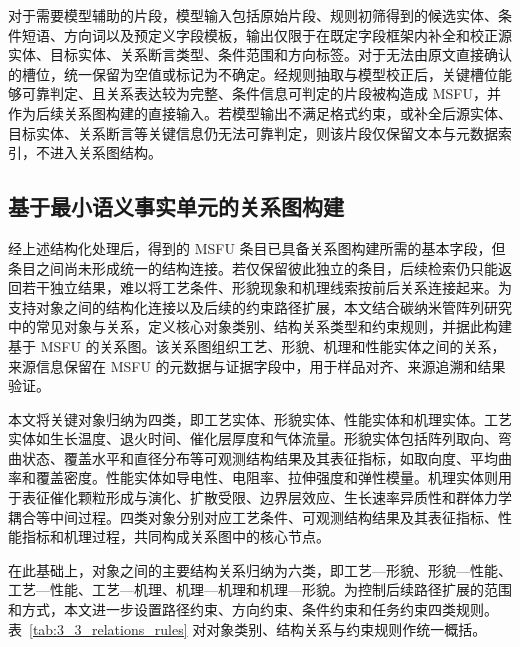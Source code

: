 对于需要模型辅助的片段，模型输入包括原始片段、规则初筛得到的候选实体、条件短语、方向词以及预定义字段模板，输出仅限于在既定字段框架内补全和校正源实体、目标实体、关系断言类型、条件范围和方向标签。对于无法由原文直接确认的槽位，统一保留为空值或标记为不确定。经规则抽取与模型校正后，关键槽位能够可靠判定、且关系表达较为完整、条件信息可判定的片段被构造成 MSFU，并作为后续关系图构建的直接输入。若模型输出不满足格式约束，或补全后源实体、目标实体、关系断言等关键信息仍无法可靠判定，则该片段仅保留文本与元数据索引，不进入关系图结构。

\subsection{基于最小语义事实单元的关系图构建}

经上述结构化处理后，得到的 MSFU 条目已具备关系图构建所需的基本字段，但条目之间尚未形成统一的结构连接。若仅保留彼此独立的条目，后续检索仍只能返回若干独立结果，难以将工艺条件、形貌现象和机理线索按前后关系连接起来。为支持对象之间的结构化连接以及后续的约束路径扩展，本文结合碳纳米管阵列研究中的常见对象与关系，定义核心对象类别、结构关系类型和约束规则，并据此构建基于 MSFU 的关系图。该关系图组织工艺、形貌、机理和性能实体之间的关系，来源信息保留在 MSFU 的元数据与证据字段中，用于样品对齐、来源追溯和结果验证。

本文将关键对象归纳为四类，即工艺实体、形貌实体、性能实体和机理实体。工艺实体如生长温度、退火时间、催化层厚度和气体流量。形貌实体包括阵列取向、弯曲状态、覆盖水平和直径分布等可观测结构结果及其表征指标，如取向度、平均曲率和覆盖密度。性能实体如导电性、电阻率、拉伸强度和弹性模量。机理实体则用于表征催化颗粒形成与演化、扩散受限、边界层效应、生长速率异质性和群体力学耦合等中间过程。四类对象分别对应工艺条件、可观测结构结果及其表征指标、性能指标和机理过程，共同构成关系图中的核心节点。

在此基础上，对象之间的主要结构关系归纳为六类，即工艺—形貌、形貌—性能、工艺—性能、工艺—机理、机理—机理和机理—形貌。为控制后续路径扩展的范围和方式，本文进一步设置路径约束、方向约束、条件约束和任务约束四类规则。表~\ref{tab:3_3_relations_rules} 对对象类别、结构关系与约束规则作统一概括。

